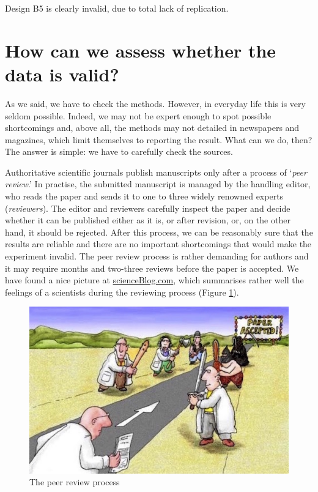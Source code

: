\documentclass[a4paper,12pt,oneside]{book}
\begin{document}
Design B5 is clearly invalid, due to total lack of replication.

\hypertarget{how-can-we-assess-whether-the-data-is-valid}{%
\section{How can we assess whether the data is valid?}\label{how-can-we-assess-whether-the-data-is-valid}}

As we said, we have to check the methods. However, in everyday life this is very seldom possible. Indeed, we may not be expert enough to spot possible shortcomings and, above all, the methods may not detailed in newspapers and magazines, which limit themselves to reporting the result. What can we do, then? The answer is simple: we have to carefully check the sources.

Authoritative scientific journals publish manuscripts only after a process of `\emph{peer review}.' In practise, the submitted manuscript is managed by the handling editor, who reads the paper and sends it to one to three widely renowned experts (\emph{reviewers}). The editor and reviewers carefully inspect the paper and decide whether it can be published either as it is, or after revision, or, on the other hand, it should be rejected. After this process, we can be reasonably sure that the results are reliable and there are no important shortcomings that would make the experiment invalid. The peer review process is rather demanding for authors and it may require months and two-three reviews before the paper is accepted. We have found a nice picture at \href{http://scienceblogs.com/startswithabang/2013/06/07/the-4-jobs-of-a-referee-in-peer-review/}{scienceBlog.com}, which summarises rather well the feelings of a scientists during the reviewing process (Figure \ref{fig:figName3}).

\begin{figure}

{\centering \includegraphics[width=0.75\linewidth]{_images/PeerReview} 

}

\caption{The peer review process}\label{fig:figName3}
\end{figure}
\end{document}

